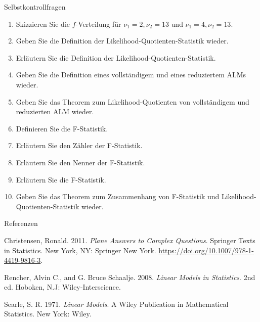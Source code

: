 \documentclass[
  8pt,
  ignorenonframetext,
]{beamer}
\providecommand{\tightlist}{%
  \setlength{\itemsep}{0pt}\setlength{\parskip}{0pt}}
\newlength{\cslhangindent}
\newlength{\cslentryspacingunit} %
\newenvironment{CSLReferences}[2] %
 {%
  \setlength{\parindent}{0pt}
  \ifodd #1
  \let\oldpar\par
  \def\par{\hangindent=\cslhangindent\oldpar}
  \fi
  \setlength{\parskip}{#2\cslentryspacingunit}
 }%
 {}
\begin{document}
\begin{frame}{Selbstkontrollfragen}
\protect\hypertarget{selbstkontrollfragen}{}
\footnotesize
{}

\begin{enumerate}
\tightlist
\item
  Skizzieren Sie die \(f\)-Verteilung für \(\nu_1 = 2, \nu_2 = 13\) und
  \(\nu_1 = 4, \nu_2 = 13\).
\item
  Geben Sie die Definition der Likelihood-Quotienten-Statistik wieder.
\item
  Erläutern Sie die Definition der Likelihood-Quotienten-Statistik.
\item
  Geben Sie die Definition eines vollständigem und eines reduziertem
  ALMs wieder.
\item
  Geben Sie das Theorem zum Likelihood-Quotienten von vollständigem und
  reduzierten ALM wieder.
\item
  Definieren Sie die F-Statistik.
\item
  Erläutern Sie den Zähler der F-Statistik.
\item
  Erläutern Sie den Nenner der F-Statistik.
\item
  Erläutern Sie die F-Statistik.
\item
  Geben Sie das Theorem zum Zusammenhang von F-Statistik und
  Likelihood-Quotienten-Statistik wieder.
\end{enumerate}
\end{frame}

\begin{frame}{Referenzen}
\protect\hypertarget{referenzen}{}
\footnotesize

\hypertarget{refs}{}
\begin{CSLReferences}{1}{0}
\leavevmode{}%
Christensen, Ronald. 2011. \emph{Plane {Answers} to {Complex
Questions}}. Springer {Texts} in {Statistics}. {New York, NY}: {Springer
New York}. \url{https://doi.org/10.1007/978-1-4419-9816-3}.

\leavevmode{}%
Rencher, Alvin C., and G. Bruce Schaalje. 2008. \emph{Linear Models in
Statistics}. 2nd ed. {Hoboken, N.J}: {Wiley-Interscience}.

\leavevmode{}%
Searle, S. R. 1971. \emph{Linear Models}. A {Wiley} Publication in
Mathematical Statistics. {New York}: {Wiley}.

\end{CSLReferences}
\end{frame}
\end{document}
